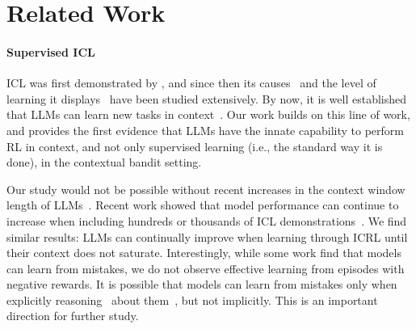 \section{Related Work}\label{sec:related}



\paragraph{Supervised ICL} 
ICL was first demonstrated by \citet{brown2020language}, and since then its causes~\citep{chan_data_2022, xie2022explanationincontextlearningimplicit, olsson2022incontextlearninginductionheads, garg2022transformers, pmlr-v202-von-oswald23a, hendel-etal-2023-context, wang2023labelwordsanchorsinformation} and the level of learning it displays~\citep{min2022rethinking, lyu-etal-2023-z} have been studied extensively.
By now, it is well established that LLMs can learn new tasks in context~\citep{garg2022transformers, wei2023largerlanguagemodelsincontext, pan-etal-2023-context, kossen2024incontextlearninglearnslabel, li2024languagemodelslearncontext}. 
Our work builds on this line of work, and provides the first evidence that LLMs have the innate capability to perform RL in context, and not only supervised learning (i.e., the standard way it is done), in the contextual bandit setting. 

Our study would not be possible without recent increases in the context window length of LLMs~\citep{dubey2024llama, abdin2024phi3technicalreporthighly, geminiteam2024geminifamilyhighlycapable}. 
Recent work showed that model performance can continue to increase when including hundreds or thousands of ICL demonstrations~\citep{bertsch2024incontext, agarwal2024manyshotincontextlearning}. We find similar results: LLMs can continually improve when learning through ICRL until their context does not saturate. Interestingly, while some work \citep{zhang2024incontextprinciplelearningmistakes, mo2024ciclcontrastiveincontextlearning, shinn2024reflexion} find that models can learn from mistakes, we do not observe effective learning from episodes with negative rewards. 
It is possible that models can learn from mistakes only when explicitly reasoning~\citep{kojima2022large, wei2022chainofthought} about them~\citep{shinn2024reflexion, zhang2024incontextprinciplelearningmistakes}, but not implicitly. This is an important direction for further study. 




